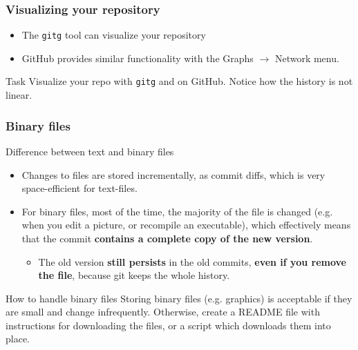 \begin{frame}

\frametitle{Visualizing your repository}

\begin{itemize}
	\item The \texttt{gitg} tool can visualize your repository
	\item GitHub provides similar functionality with the Graphs $\rightarrow$ Network menu.
\end{itemize}

\begin{block}{Task}
	Visualize your repo with \texttt{gitg} and on GitHub. Notice how the history is not linear. 
\end{block}

\end{frame}


\begin{frame}
	\frametitle{Binary files}
	
	\begin{block}{Difference between text and binary files}
	\begin{itemize}
	\item Changes to files are stored incrementally, as commit diffs, which is very space-efficient for text-files.
    \item For binary files, most of the time, the majority of the file is changed (e.g. when you edit a picture, or recompile an executable), which effectively means that the commit \textbf{contains a complete copy of the new version}.
    \begin{itemize}
    \item The old version \textbf{still persists} in the old commits, \textbf{even if you remove the file}, because git keeps the whole history.
    \end{itemize}
    \end{itemize}
	\end{block}
	
	\begin{block}{How to handle binary files}
	Storing binary files (e.g. graphics) is acceptable if they are small and change infrequently. Otherwise, create a README file with instructions for downloading the files, or a script which downloads them into place.
	\end{block}
\end{frame}

